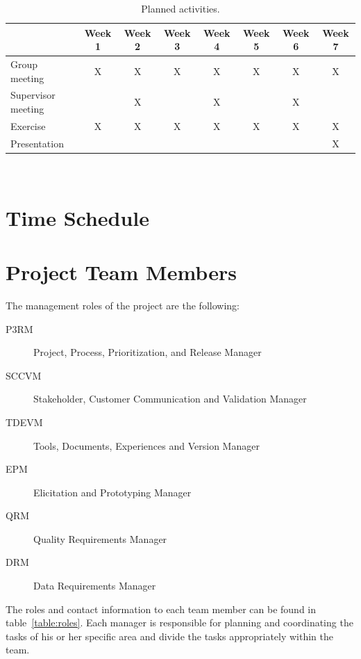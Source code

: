 \documentclass[10pt,a4paper]{article}
\begin{document}
\begin{table}[h!]
\centering
\caption{Planned activities.}
\label{table:meet}
\begin{tabular}{|l|c|c|c|c|c|c|c|} \hline
&Week 1 & Week 2 & Week 3 & Week 4 & Week 5 & Week 6 & Week 7\\ \hline
Group meeting & X &X&X&X&X&X&X\\ \hline
Supervisor meeting &&X&&X&&X&\\ \hline
Exercise & X &X&X&X&X&X&X\\ \hline
Presentation &&&&&&&X\\ \hline 
\end{tabular}\\
\end{table}


\section{Time Schedule}

\section{Project Team Members}
The management roles of the project are the following:

\begin{description}
\item[P3RM] Project, Process, Prioritization, and Release Manager
\item[SCCVM] Stakeholder, Customer Communication and Validation Manager
\item[TDEVM] Tools, Documents, Experiences and Version Manager 
\item[EPM] Elicitation and Prototyping Manager
\item[QRM] Quality Requirements Manager
\item[DRM] Data Requirements Manager
\end{description}

The roles and contact information to each team member can be found in table~\ref{table:roles}. Each manager is responsible for planning and coordinating the tasks of his or her specific area and divide the tasks appropriately within the team.
\end{document}
